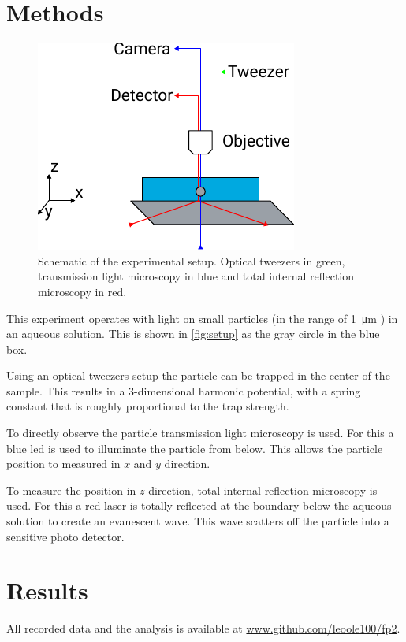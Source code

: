 \documentclass[
    twoside=false,
    twocolumn=true,
    fontsize=11pt,
]{scrarticle}
\begin{document}
\section{Methods}
\begin{figure}
    \centering
    \includegraphics{figures/setup.pdf}
    \caption{Schematic of the experimental setup. Optical tweezers in green, transmission light microscopy in blue and total internal reflection microscopy in red.}
    \label{fig:setup}
\end{figure}
This experiment operates with light on small particles (in the range of \SI{1}{\micro m} \cite{instructions}) in an aqueous solution.
This is shown in \autoref{fig:setup} as the gray circle in the blue box. 

Using an optical tweezers setup the particle can be trapped in the center of the sample.
This results in a 3-dimensional harmonic potential, with a spring constant that is roughly proportional to the trap strength.

To directly observe the particle transmission light microscopy is used.
For this a blue led is used to illuminate the particle from below.
This allows the particle position to measured in $x$ and $y$ direction.

To measure the position in $z$ direction, total internal reflection microscopy is used.
For this a red laser is totally reflected at the boundary below the aqueous solution to create an evanescent wave.
This wave scatters off the particle into a sensitive photo detector.


\section{Results}
All recorded data and the analysis is available at \url{www.github.com/leoole100/fp2}.
\end{document}
